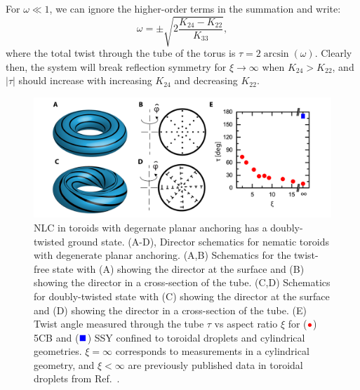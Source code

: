 For $\omega \ll 1$, we can ignore the higher-order terms in the summation and write:
\begin{equation}
  \omega = \pm \sqrt{2\frac{K_{24}-K_{22}}{K_{33}}},
\end{equation}
where the total twist through the tube of the torus is $\tau = 2 \arcsin (\omega)$.
Clearly then, the system will break reflection symmetry for $\xi \rightarrow \infty$ when $K_{24}> K_{22}$, and $|\tau|$ should increase with increasing $K_{24}$ and decreasing $K_{22}$.
\begin{figure}
  \centering
  \includegraphics{figures/C4/Ch4-Figs_PlanarTwist.png}
  \caption{NLC in toroids with degernate planar anchoring has a doubly-twisted ground state.
  (A-D), Director schematics for nematic toroids with degenerate planar anchoring.
  (A,B) Schematics for the twist-free state with (A) showing the director at the surface and (B) showing the director in a cross-section of the tube.
  (C,D) Schematics for doubly-twisted state with (C) showing the director at the surface and (D) showing the director in a cross-section of the tube.
  (E) Twist angle measured through the tube $\tau$ vs aspect ratio $\xi$ for (${\color{red} \bullet}$) 5CB and (${\color{blue} \blacksquare}$) SSY confined to toroidal droplets and cylindrical geometries.
  $\xi = \infty$ corresponds to measurements in a cylindrical geometry, and $\xi < \infty$ are previously published data in toroidal droplets from Ref.~\cite{RN46}.}\label{f:4-PlanarToroidsTwist}
\end{figure}

